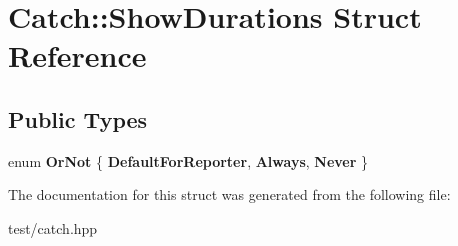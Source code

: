 \hypertarget{structCatch_1_1ShowDurations}{}\section{Catch\+:\+:Show\+Durations Struct Reference}
\label{structCatch_1_1ShowDurations}
\subsection*{Public Types}
\begin{DoxyCompactItemize}
\item 
enum {\bfseries Or\+Not} \{ {\bfseries Default\+For\+Reporter}, 
{\bfseries Always}, 
{\bfseries Never}
 \}\hypertarget{structCatch_1_1ShowDurations_a82fa0174554187220c1eda175f122ee1}{}\label{structCatch_1_1ShowDurations_a82fa0174554187220c1eda175f122ee1}

\end{DoxyCompactItemize}


The documentation for this struct was generated from the following file\+:\begin{DoxyCompactItemize}
\item 
test/catch.\+hpp\end{DoxyCompactItemize}
